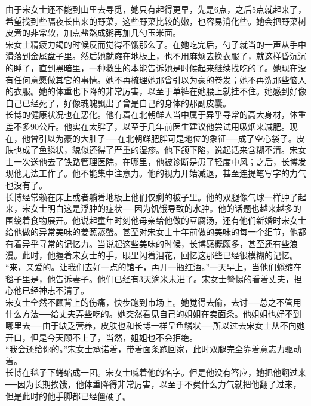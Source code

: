 由于宋女士还不能到山里去寻觅，她只有起得更早，先是6点，之后5点就起来了，希望找到些隔夜长出来的野菜，这些野菜比较的嫩，也容易消化些。她会把野菜树皮煮的非常软，加点盐熬成粥再加几勺玉米面。\\

宋女士精疲力竭的时候反而觉得不饿那么了。在她吃完后，勺子就当的一声从手中滑落到金属盘子里。然后她就瘫在地板上，也不用麻烦去换衣服了，就这样昏沉沉的睡了，直到黑暗里，一种救生的本能告诉她是时候起来继续找吃的了。她现在没有任何意愿做其它的事情。她不再梳理她那曾引以为豪的卷发；她不再洗那些恼人的衣服。她的体重也下降的非常厉害，以至于单裤在她腰上就挂不住。她感到好像自己已经死了，好像魂魄飘出了曾是自己的身体的那副皮囊。\\

长博的健康状况也在恶化。他有着在北朝鲜人当中属于异乎寻常的高大身材，体重差不多90公斤。他实在太胖了，以至于几年前医生建议他尝试用吸烟来减肥。现在，他曾引以为豪的大肚子──在北朝鲜肥胖可是地位的象征──成了空心袋子。皮肤也成了鱼鳞状，貌似还得了严重的湿疹。他下颌下陷，说起话来含糊不清。宋女士一次送他去了铁路管理医院，在哪里，他被诊断是患了轻度中风；之后，长博发现他无法工作了。他不能集中注意力。他的视力开始减退，甚至连提笔写字的力气也没有了。\\

长博经常赖在床上或者躺着地板上他们仅剩的被子里。他的双腿像气球一样肿了起来，宋女士明白这是浮肿的症状──因为饥饿导致的水肿。他的话题也越来越多的围绕着食物展开。他说起童年时刻他母亲给他做的豆腐汤，还有他们新婚时宋女士给他做的异常美味的姜葱蒸蟹。甚至对宋女士十年前做的美味的每一个细节，他都有着异乎寻常的记忆力。当说起这些美味的时候，长博感概颇多，甚至还有些浪漫。此时，他握着宋女士的手，眼里闪着泪花，回忆这那些已经很模糊的记忆。\\

“来，亲爱的。让我们去好一点的馆子，再开一瓶红酒。”一天早上，当他们蜷缩在毯子里是，他告诉妻子。他们已经有3天滴米未进了。宋女士警惕的看着丈夫，担心他已经神志不清了。\\

宋女士全然不顾背上的伤痛，快步跑到市场上。她觉得去偷，去讨──总之不管用什么方法──给丈夫弄些吃的。她突然看见自己的姐姐在卖面条。他姐姐也好不到哪里去──由于缺乏营养，皮肤也和长博一样呈鱼鳞状──所以过去宋女士从不向她开口，但是今天顾不上了，当然，姐姐也不会拒绝。\\

“我会还给你的。”宋女士承诺着，带着面条跑回家，此时双腿完全靠着意志力驱动着。\\

长博在毯子下蜷缩成一团。宋女士喊着他的名字。但是他没有答应，她把他翻过来──因为长期挨饿，他体重降得非常厉害，以至于不费什么力气就把他翻了过来，但是此时的他手脚都已经僵硬了。\\

